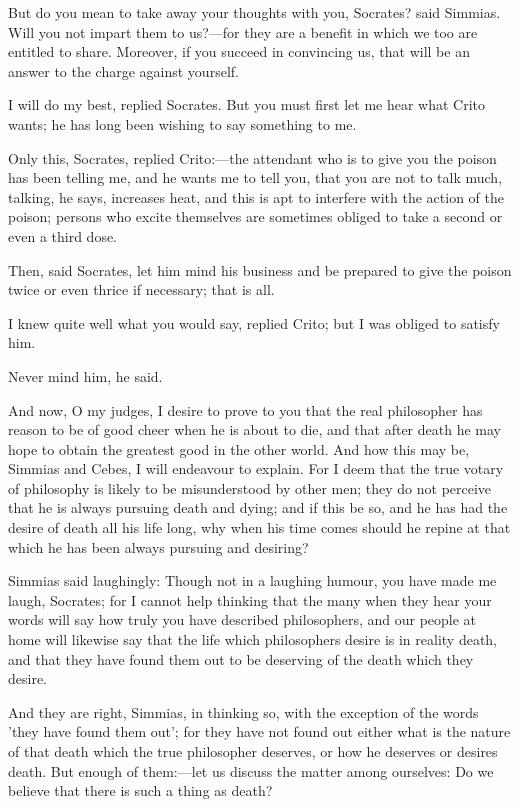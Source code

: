 But do you mean to take away your thoughts with you, Socrates? said
Simmias. Will you not impart them to us?—for they are a benefit in
which we too are entitled to share. Moreover, if you succeed in convincing
us, that will be an answer to the charge against yourself.

I will do my best, replied Socrates. But you must first let me hear what
Crito wants; he has long been wishing to say something to me.

Only this, Socrates, replied Crito:—the attendant who is to give you
the poison has been telling me, and he wants me to tell you, that you are
not to talk much, talking, he says, increases heat, and this is apt to
interfere with the action of the poison; persons who excite themselves are
sometimes obliged to take a second or even a third dose.

Then, said Socrates, let him mind his business and be prepared to give the
poison twice or even thrice if necessary; that is all.

I knew quite well what you would say, replied Crito; but I was obliged to
satisfy him.

Never mind him, he said.

And now, O my judges, I desire to prove to you that the real philosopher
has reason to be of good cheer when he is about to die, and that after
death he may hope to obtain the greatest good in the other world. And how
this may be, Simmias and Cebes, I will endeavour to explain. For I deem
that the true votary of philosophy is likely to be misunderstood by other
men; they do not perceive that he is always pursuing death and dying; and
if this be so, and he has had the desire of death all his life long, why
when his time comes should he repine at that which he has been always
pursuing and desiring?

Simmias said laughingly: Though not in a laughing humour, you have made me
laugh, Socrates; for I cannot help thinking that the many when they hear
your words will say how truly you have described philosophers, and our
people at home will likewise say that the life which philosophers desire
is in reality death, and that they have found them out to be deserving of
the death which they desire.

And they are right, Simmias, in thinking so, with the exception of the
words 'they have found them out'; for they have not found out either what
is the nature of that death which the true philosopher deserves, or how he
deserves or desires death. But enough of them:—let us discuss the
matter among ourselves: Do we believe that there is such a thing as death?

